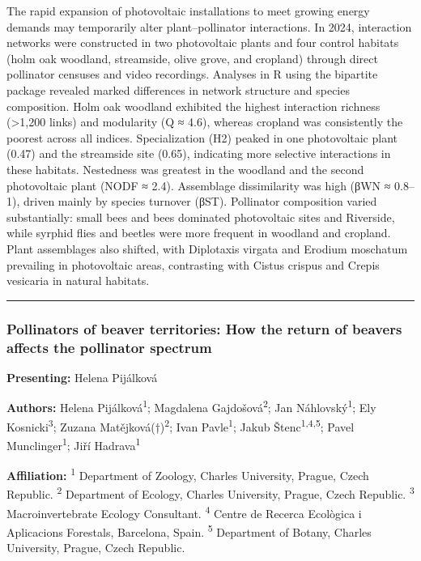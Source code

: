 \documentclass[
  letterpaper,
  DIV=11,
  numbers=noendperiod]{scrartcl}
\begin{document}
The rapid expansion of photovoltaic installations to meet growing energy
demands may temporarily alter plant--pollinator interactions. In 2024,
interaction networks were constructed in two photovoltaic plants and
four control habitats (holm oak woodland, streamside, olive grove, and
cropland) through direct pollinator censuses and video recordings.
Analyses in R using the bipartite package revealed marked differences in
network structure and species composition. Holm oak woodland exhibited
the highest interaction richness (\textgreater1,200 links) and
modularity (Q ≈ 4.6), whereas cropland was consistently the poorest
across all indices. Specialization (H2) peaked in one photovoltaic plant
(0.47) and the streamside site (0.65), indicating more selective
interactions in these habitats. Nestedness was greatest in the woodland
and the second photovoltaic plant (NODF ≈ 2.4). Assemblage dissimilarity
was high (βWN ≈ 0.8--1), driven mainly by species turnover (βST).
Pollinator composition varied substantially: small bees and bees
dominated photovoltaic sites and Riverside, while syrphid flies and
beetles were more frequent in woodland and cropland. Plant assemblages
also shifted, with Diplotaxis virgata and Erodium moschatum prevailing
in photovoltaic areas, contrasting with Cistus crispus and Crepis
vesicaria in natural habitats.

\begin{center}\rule{0.5\linewidth}{0.5pt}\end{center}

\subsubsection{Pollinators of beaver territories: How the return of
beavers affects the pollinator
spectrum}\label{pollinators-of-beaver-territories-how-the-return-of-beavers-affects-the-pollinator-spectrum}

\textbf{Presenting:} Helena Pijálková

\textbf{Authors:} Helena Pijálková\textsuperscript{1}; Magdalena
Gajdošová\textsuperscript{2}; Jan Náhlovský\textsuperscript{1}; Ely
Kosnicki\textsuperscript{3}; Zuzana Matějková(†)\textsuperscript{2};
Ivan Pavle\textsuperscript{1}; Jakub Štenc\textsuperscript{1,4,5}; Pavel
Munclinger\textsuperscript{1}; Jiří Hadrava\textsuperscript{1}

\textbf{Affiliation:} \textsuperscript{1} Department of Zoology, Charles
University, Prague, Czech Republic. \textsuperscript{2} Department of
Ecology, Charles University, Prague, Czech Republic. \textsuperscript{3}
Macroinvertebrate Ecology Consultant. \textsuperscript{4} Centre de
Recerca Ecològica i Aplicacions Forestals, Barcelona, Spain.
\textsuperscript{5} Department of Botany, Charles University, Prague,
Czech Republic.
\end{document}
